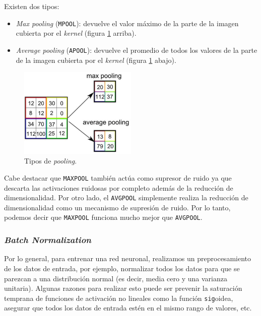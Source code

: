 \documentclass[a4paper,12pt]{article}
\begin{document}
Existen dos tipos:
\begin{itemize}
	\item \textit{Max pooling} (\texttt{MPOOL}): devuelve el valor máximo de la parte de la imagen cubierta por el \textit{kernel} (figura \ref{fig:type-pooling} arriba).
	\item \textit{Average pooling} (\texttt{APOOL}): devuelve el promedio de todos los valores de la parte de la imagen cubierta por el \textit{kernel} (figura \ref{fig:type-pooling} abajo).
\end{itemize}

\begin{figure}[H]
	\begin{center}				
	\includegraphics[width=0.5\textwidth]{tesis_45.png}
  	\caption{Tipos de \textit{pooling}.}
  	\label{fig:type-pooling}
  	\end{center}
\end{figure}

Cabe destacar que \texttt{MAXPOOL} también actúa como supresor de ruido ya que descarta las activaciones ruidosas por completo además de la reducción de dimensionalidad. Por otro lado, el \texttt{AVGPOOL} simplemente realiza la reducción de dimensionalidad como un mecanismo de supresión de ruido. Por lo tanto, podemos decir que \texttt{MAXPOOL} funciona mucho mejor que \texttt{AVGPOOL}.

\subsubsection{\textit{Batch Normalization}}


Por lo general, para entrenar una red neuronal, realizamos un preprocesamiento de los datos de entrada, por ejemplo, normalizar todos los datos para que se parezcan a una distribución normal (es decir, media cero y una varianza unitaria). Algunas razones para realizar esto puede ser prevenir la saturación temprana de funciones de activación no lineales como la función \texttt{sig}oidea, asegurar que todos los datos de entrada estén en el mismo rango de valores, etc. \citep{bn}
\end{document}
